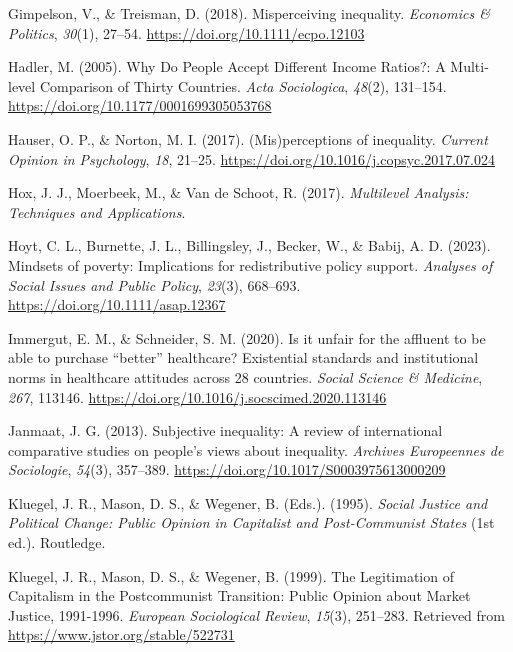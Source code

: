 \documentclass[
  12pt,
]{article}
\newlength{\cslhangindent}
\newenvironment{CSLReferences}[2] %
 {\begin{list}{}{%
  \setlength{\itemindent}{0pt}
  \setlength{\leftmargin}{0pt}
  \setlength{\parsep}{0pt}
  \ifodd #1
   \setlength{\leftmargin}{\cslhangindent}
   \setlength{\itemindent}{-1\cslhangindent}
  \fi
  \setlength{\itemsep}{#2\baselineskip}}}
 {\end{list}}
\begin{document}
\begin{CSLReferences}{1}{0}
Gimpelson, V., \& Treisman, D. (2018). Misperceiving inequality.
\emph{Economics \& Politics}, \emph{30}(1), 27--54.
\url{https://doi.org/10.1111/ecpo.12103}

Hadler, M. (2005). Why {Do People Accept Different Income Ratios}?: {A
Multi-level Comparison} of {Thirty Countries}. \emph{Acta Sociologica},
\emph{48}(2), 131--154. \url{https://doi.org/10.1177/0001699305053768}

Hauser, O. P., \& Norton, M. I. (2017). ({Mis})perceptions of
inequality. \emph{Current Opinion in Psychology}, \emph{18}, 21--25.
\url{https://doi.org/10.1016/j.copsyc.2017.07.024}

Hox, J. J., Moerbeek, M., \& Van de Schoot, R. (2017). \emph{Multilevel
{Analysis}: {Techniques} and {Applications}}.

Hoyt, C. L., Burnette, J. L., Billingsley, J., Becker, W., \& Babij, A.
D. (2023). Mindsets of poverty: {Implications} for redistributive policy
support. \emph{Analyses of Social Issues and Public Policy},
\emph{23}(3), 668--693. \url{https://doi.org/10.1111/asap.12367}

Immergut, E. M., \& Schneider, S. M. (2020). Is it unfair for the
affluent to be able to purchase {``better''} healthcare? {Existential}
standards and institutional norms in healthcare attitudes across 28
countries. \emph{Social Science \& Medicine}, \emph{267}, 113146.
\url{https://doi.org/10.1016/j.socscimed.2020.113146}

Janmaat, J. G. (2013). Subjective inequality: {A} review of
international comparative studies on people's views about inequality.
\emph{Archives Europeennes de Sociologie}, \emph{54}(3), 357--389.
\url{https://doi.org/10.1017/S0003975613000209}

Kluegel, J. R., Mason, D. S., \& Wegener, B. (Eds.). (1995).
\emph{Social {Justice} and {Political Change}: {Public Opinion} in
{Capitalist} and {Post-Communist States}} (1st ed.). Routledge.

Kluegel, J. R., Mason, D. S., \& Wegener, B. (1999). The {Legitimation}
of {Capitalism} in the {Postcommunist Transition}: {Public Opinion}
about {Market Justice}, 1991-1996. \emph{European Sociological Review},
\emph{15}(3), 251--283. Retrieved from
\url{https://www.jstor.org/stable/522731}


\end{CSLReferences}
\end{document}
